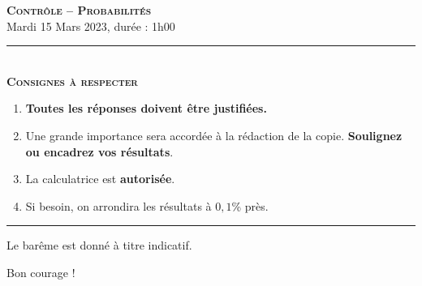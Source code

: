 \documentclass[11pt]{article}
\begin{document}

%
%
%

\begin{center}
\textbf{\LARGE \textsc{Contrôle -- Probabilités}}\\[2mm]

{\large Mardi 15 Mars 2023, durée : 1h00}\\[1mm]
\noindent\rule{8cm}{0.4pt}\\[1mm]
\textbf{\textsc{Consignes à respecter}}
\begin{enumerate}[label=\textbf{\arabic*/}]
\item \textbf{Toutes les réponses doivent être justifiées.}
\item Une grande importance sera accordée à la rédaction de la
  copie. \textbf{Soulignez ou encadrez vos résultats}.
\item La calculatrice est \textbf{autorisée}.
\item Si besoin, on arrondira les résultats à $0,1$\% près.
    \end{enumerate}
\noindent\rule{12cm}{0.4pt}
\end{center}

\vspace{2mm}
\noindent Le barême est donné à titre indicatif.
\vspace{2mm}
\begin{center}
  Bon courage !
\end{center}
\end{document}
